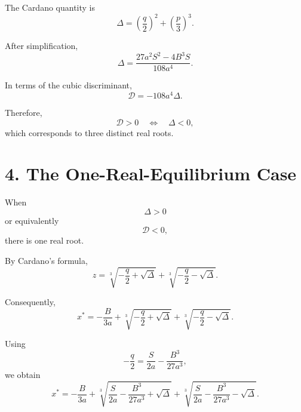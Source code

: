\documentclass[11pt,a4paper]{article}
\begin{document}
The Cardano quantity is
\begin{equation}
\Delta
=
\left(\frac q2\right)^2
+
\left(\frac p3\right)^3.
\tag{16}
\end{equation}

After simplification,
\begin{equation}
\boxed{
\Delta
=
\frac{
27a^2S^2-4B^3S
}{
108a^4
}.
}
\tag{17}
\end{equation}

In terms of the cubic discriminant,
\begin{equation}
\boxed{
\mathcal{D}
=
-108a^4\Delta.
}
\tag{18}
\end{equation}

Therefore,
\begin{equation}
\mathcal{D}>0
\quad\Longleftrightarrow\quad
\Delta<0,
\end{equation}
which corresponds to three distinct real roots.

\section{4. The One-Real-Equilibrium Case}

When
\begin{equation}
\Delta>0
\end{equation}
or equivalently
\begin{equation}
\mathcal{D}<0,
\end{equation}
there is one real root.

By Cardano's formula,
\begin{equation}
z=
\sqrt[3]{-\frac q2+\sqrt{\Delta}}
+
\sqrt[3]{-\frac q2-\sqrt{\Delta}}.
\end{equation}

Consequently,
\begin{equation}
\boxed{
x^*
=
-\frac{B}{3a}
+
\sqrt[3]{-\frac q2+\sqrt{\Delta}}
+
\sqrt[3]{-\frac q2-\sqrt{\Delta}}.
}
\tag{19}
\end{equation}

Using
\begin{equation}
-\frac q2
=
\frac{S}{2a}
-\frac{B^3}{27a^3},
\end{equation}
we obtain
\begin{equation}
\boxed{
x^*
=
-\frac{B}{3a}
+
\sqrt[3]{
\frac{S}{2a}
-\frac{B^3}{27a^3}
+\sqrt{\Delta}}
+
\sqrt[3]{
\frac{S}{2a}
-\frac{B^3}{27a^3}
-\sqrt{\Delta}}
.
}
\tag{20}
\end{equation}
\end{document}

